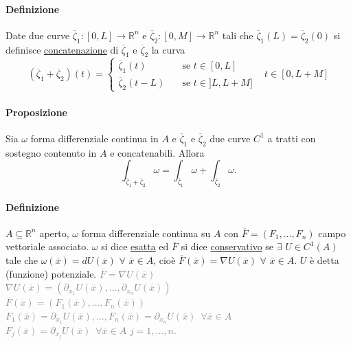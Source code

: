 \documentclass{article}
\newcommand{\R}{\mathbb{R}}
\begin{document}
\paragraph{{Definizione}}
Date due curve $\overline{\zeta}_1:[0,L]\rightarrow \R^n$ e $\overline{\zeta}_2:[0,M]\rightarrow \R^n$ tali che $\overline{\zeta}_1(L)=\overline{\zeta}_2(0)$ si definisce \underline{concatenazione} di $\overline{\zeta}_1$ e $\overline{\zeta}_2$ la curva 
\begin{equation*}
    (\overline{\zeta}_1+\overline{\zeta}_2)(t)=\begin{cases}
    \overline{\zeta}_1 (t)\,\,\,\, &\text{  se  } t\in[0,L]\\
    \overline{\zeta}_2 (t-L) \,\,\,\, &\text{  se  } t \in ]L,L+M]
\end{cases}\,\,\,\,\, t \in [0,L+M]
\end{equation*}

\paragraph{{Proposizione}} Sia $\omega$ forma differenziale continua in $A$ e $\overline{\zeta}_1$ e $\overline{\zeta}_2$ due curve $C^1$ a tratti con sostegno contenuto in $A$ e concatenabili. Allora
\begin{equation*}
    \int_{\overline{\zeta}_1+\overline{\zeta}_2}\omega= \int_{\overline{\zeta}_1}\omega + \int_{\overline{\zeta}_2}\omega.
\end{equation*}

\paragraph{{Definizione}}
$A \subseteq \R^n$ aperto, $\omega$ forma differenziale continua su $A$ con $\overline{F}=(F_1,...,F_n)$ campo vettoriale associato. $\omega$ si dice \underline{esatta} ed $\overline{F}$ si dice \underline{conservativo} se $\exists \,\,U \in  C^1(A)$ tale che $\omega(\overline{x})=dU(\overline{x})\,\, \forall\,\, \overline{x} \in A$, cioè $\overline{F}(\overline{x})=\nabla U(\overline{x})\,\, \forall\,\, \overline{x}\in A$. $U $ è detta (funzione) potenziale. 
\textcolor{grey}{$\overline{F} = \nabla U(\overline{x})$\\
$\nabla U(\overline{x})=(\partial_{x_1}U(\overline{x}),..., \partial_{x_n}U(\overline{x}))$\\
$\overline{F}(\overline{x})=(F_1(\overline{x}),...,F_n(\overline{x}))$\\
$F_1(\overline{x}) =\partial_{x_1}U(\overline{x}),..., F_n(\overline{x})=\partial_{x_n} U(\overline{x})\,\,\, \forall \overline{x}\in A$\\
$F_j(\overline{x})=\partial_{x_j}U(\overline{x})\,\,\, \forall \overline{x}\in A\,\, j=1,...,n$.}
\end{document}
